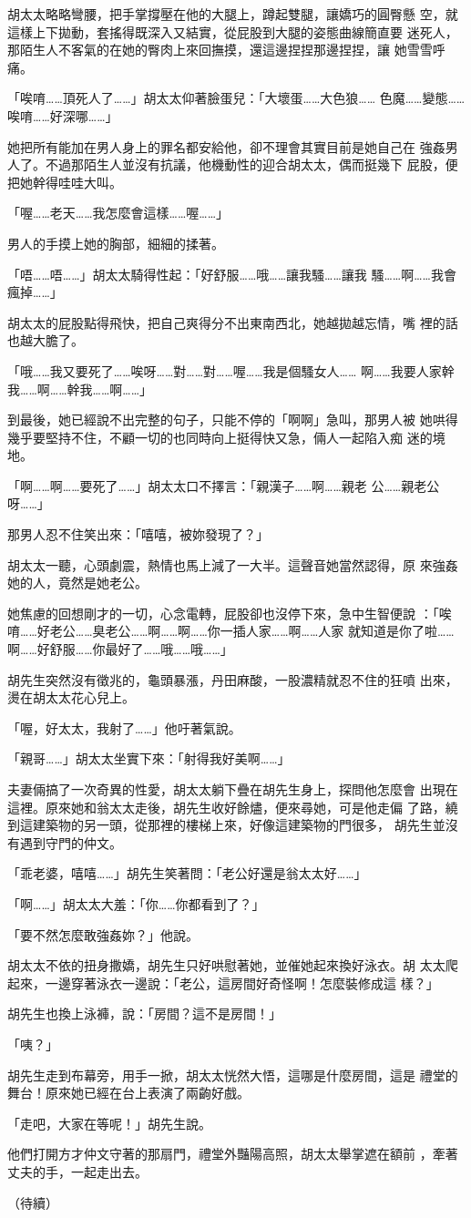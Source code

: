 胡太太略略彎腰，把手掌撐壓在他的大腿上，蹲起雙腿，讓嬌巧的圓臀懸
空，就這樣上下拋動，套搖得既深入又結實，從屁股到大腿的姿態曲線簡直要
迷死人，那陌生人不客氣的在她的臀肉上來回撫摸，還這邊捏捏那邊捏捏，讓
她雪雪呼痛。

「唉唷……頂死人了……」胡太太仰著臉蛋兒：「大壞蛋……大色狼……
色魔……變態……唉唷……好深哪……」

她把所有能加在男人身上的罪名都安給他，卻不理會其實目前是她自己在
強姦男人了。不過那陌生人並沒有抗議，他機動性的迎合胡太太，偶而挺幾下
屁股，便把她幹得哇哇大叫。

「喔……老天……我怎麼會這樣……喔……」

男人的手摸上她的胸部，細細的揉著。

「唔……唔……」胡太太騎得性起：「好舒服……哦……讓我騷……讓我
騷……啊……我會瘋掉……」

胡太太的屁股點得飛快，把自己爽得分不出東南西北，她越拋越忘情，嘴
裡的話也越大膽了。

「哦……我又要死了……唉呀……對……對……喔……我是個騷女人……
啊……我要人家幹我……啊……幹我……啊……」

到最後，她已經說不出完整的句子，只能不停的「啊啊」急叫，那男人被
她哄得幾乎要堅持不住，不顧一切的也同時向上挺得快又急，倆人一起陷入痴
迷的境地。

「啊……啊……要死了……」胡太太口不擇言：「親漢子……啊……親老
公……親老公呀……」

那男人忍不住笑出來：「嘻嘻，被妳發現了？」

胡太太一聽，心頭劇震，熱情也馬上減了一大半。這聲音她當然認得，原
來強姦她的人，竟然是她老公。

她焦慮的回想剛才的一切，心念電轉，屁股卻也沒停下來，急中生智便說
：「唉唷……好老公……臭老公……啊……啊……你一插人家……啊……人家
就知道是你了啦……啊……好舒服……你最好了……哦……哦……」

胡先生突然沒有徵兆的，龜頭暴漲，丹田麻酸，一股濃精就忍不住的狂噴
出來，燙在胡太太花心兒上。

「喔，好太太，我射了……」他吁著氣說。

「親哥……」胡太太坐實下來：「射得我好美啊……」

夫妻倆搞了一次奇異的性愛，胡太太躺下疊在胡先生身上，探問他怎麼會
出現在這裡。原來她和翁太太走後，胡先生收好餘燼，便來尋她，可是他走偏
了路，繞到這建築物的另一頭，從那裡的樓梯上來，好像這建築物的門很多，
胡先生並沒有遇到守門的仲文。

「乖老婆，嘻嘻……」胡先生笑著問：「老公好還是翁太太好……」

「啊……」胡太太大羞：「你……你都看到了？」

「要不然怎麼敢強姦妳？」他說。

胡太太不依的扭身撒嬌，胡先生只好哄慰著她，並催她起來換好泳衣。胡
太太爬起來，一邊穿著泳衣一邊說：「老公，這房間好奇怪啊！怎麼裝修成這
樣？」

胡先生也換上泳褲，說：「房間？這不是房間！」

「咦？」

胡先生走到布幕旁，用手一掀，胡太太恍然大悟，這哪是什麼房間，這是
禮堂的舞台！原來她已經在台上表演了兩齣好戲。

「走吧，大家在等呢！」胡先生說。

他們打開方才仲文守著的那扇門，禮堂外豔陽高照，胡太太舉掌遮在額前
，牽著丈夫的手，一起走出去。


（待續）










